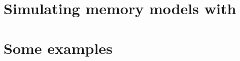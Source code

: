 \documentclass{article}
\begin{document}
\clearpage
\part{Simulating\label{part:herd} memory models with \herd}


%

\clearpage
\part{Some \label{part:examples} examples}


%




\end{document}

